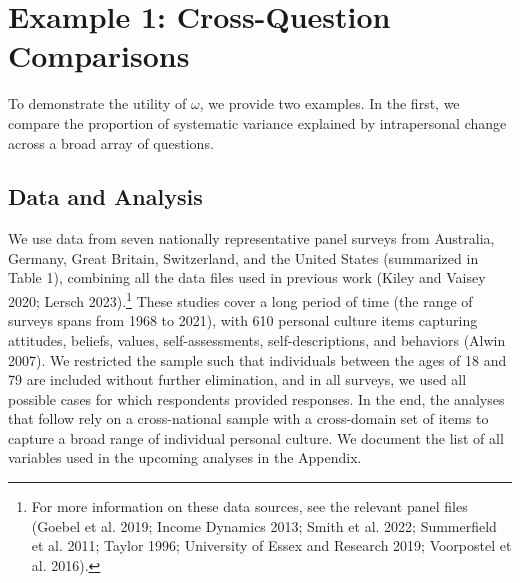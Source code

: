 \documentclass[
  11pt,
]{article}
\begin{document}
\section{Example 1: Cross-Question
Comparisons}\label{example-1-cross-question-comparisons}

To demonstrate the utility of \(\omega\), we provide two examples. In
the first, we compare the proportion of systematic variance explained by
intrapersonal change across a broad array of questions.

\subsection{Data and Analysis}\label{data-and-analysis}

We use data from seven nationally representative panel surveys from
Australia, Germany, Great Britain, Switzerland, and the United States
(summarized in Table 1), combining all the data files used in previous
work (Kiley and Vaisey 2020; Lersch 2023).\footnote{For more information
  on these data sources, see the relevant panel files (Goebel et al.
  2019; Income Dynamics 2013; Smith et al. 2022; Summerfield et al.
  2011; Taylor 1996; University of Essex and Research 2019; Voorpostel
  et al. 2016).} These studies cover a long period of time (the range of
surveys spans from 1968 to 2021), with 610 personal culture items
capturing attitudes, beliefs, values, self-assessments,
self-descriptions, and behaviors (Alwin 2007). We restricted the sample
such that individuals between the ages of 18 and 79 are included without
further elimination, and in all surveys, we used all possible cases for
which respondents provided responses. In the end, the analyses that
follow rely on a cross-national sample with a cross-domain set of items
to capture a broad range of individual personal culture. We document the
list of all variables used in the upcoming analyses in the Appendix.

\begin{table}[H]
\centering
\caption{\label{tab:unnamed-chunk-1}The Description of the Data Sources}
\centering
{}
\end{table}
\end{document}

